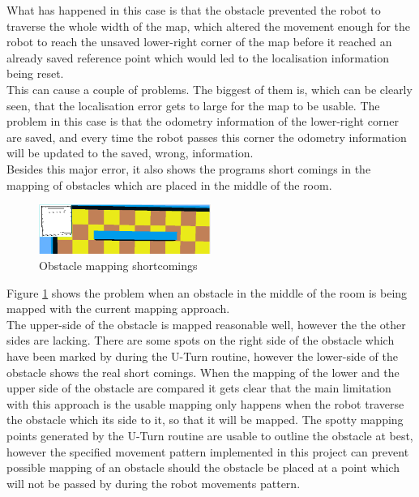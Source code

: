 What has happened in this case is that the obstacle prevented the robot to traverse the whole width of the map, which altered the movement enough for the robot to reach the unsaved lower-right corner of the map before it reached an already saved reference point which would led to the localisation information being reset. \\
This can cause a couple of problems. The biggest of them is, which can be clearly seen, that the localisation error gets to large for the map to be usable. The problem in this case is that the odometry information of the lower-right corner are saved, and every time the robot passes this corner the odometry information will be updated to the saved, wrong, information.\\[3ex]

Besides this major error, it also shows the programs short comings in the mapping of obstacles which are placed in the middle of the room.  

\begin{figure}[h]
\centering
\includegraphics[width = 0.5\textwidth]{../../figures/map_results/obstacle_mapping_error.png} 
\caption{Obstacle mapping shortcomings}
\label{obstacle_mapping_error}
\end{figure}

Figure \ref{obstacle_mapping_error} shows the problem when an obstacle in the middle of the room is being mapped with the current mapping approach. \\
The upper-side of the obstacle is mapped reasonable well, however the the other sides are lacking. There are some spots on the right side of the obstacle which have been marked by during the U-Turn routine, however the lower-side of the obstacle shows the real short comings. When the mapping of the lower and the upper side of the obstacle are compared it gets clear that the main limitation with this approach is the usable mapping only happens when the robot traverse the obstacle which its side to it, so that it will be mapped. The spotty mapping points generated by the U-Turn routine are usable to outline the obstacle at best, however the specified movement pattern implemented in this project can prevent possible mapping of an obstacle should the obstacle be placed at a point which will not be passed by during the robot movements pattern. \\[3ex]

